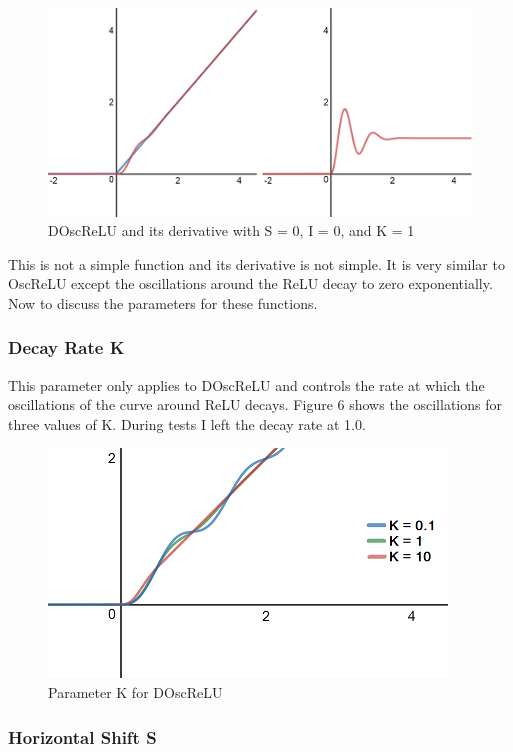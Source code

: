 \documentclass{amsart}
\theoremstyle{definition}
\theoremstyle{remark}
\numberwithin{equation}{section}
\newcommand{\blankbox}[2]{%
  \parbox{\columnwidth}{\centering
    \setlength{\fboxsep}{0pt}%
    \fbox{\raisebox{0pt}[#2]{\hspace{#1}}}%
  }%
}
\begin{document}
\begin{figure}[!h]
\includegraphics[1]{DOscReLU_with_ReLU_Deriv.png}
\caption{DOscReLU and its derivative with S = 0, I = 0, and K = 1}
\label{Figure 4}
\end{figure}  

This is not a simple function and its derivative is not simple.  It is very similar to OscReLU except the oscillations around the ReLU decay to zero exponentially.   
Now to discuss the parameters for these functions.  

\newpage
\subsubsection{Decay Rate K} \hfill\break  

This parameter only applies to DOscReLU and controls the rate at which the oscillations of the curve around ReLU decays.  Figure 6 shows the oscillations for three values of K.  During tests I left the decay rate at 1.0.

\begin{figure}[!h]
\includegraphics[1]{DecayRate.png}
\caption{Parameter K for DOscReLU}
\label{Figure 5}
\end{figure} 

\subsubsection{Horizontal Shift S} \hfill\break  
\end{document}
